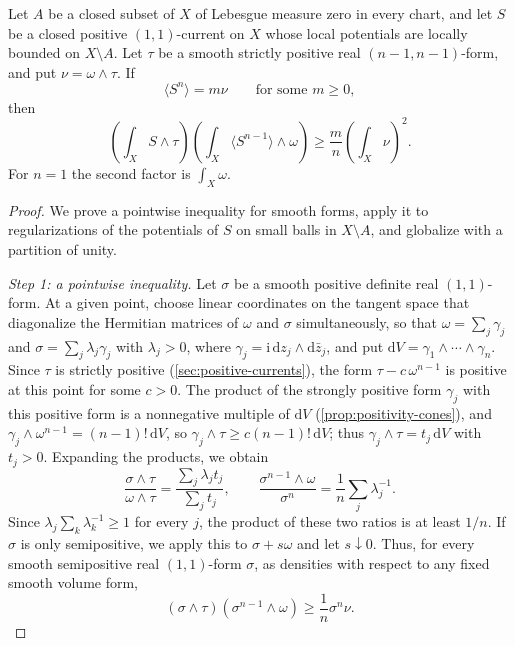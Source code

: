 \begin{lemma}\label{lem:prescribed-density-mixed-trace}
Let $A$ be a closed subset of $X$ of Lebesgue measure zero in every chart, and let $S$ be a closed positive $(1,1)$-current on $X$ whose local potentials are locally bounded on $X\setminus A$. Let $\tau$ be a smooth strictly positive real $(n-1,n-1)$-form, and put $\nu=\omega\wedge\tau$. If
\[
 \langle S^n\rangle=m\nu\qquad\text{for some }m\geq0,
\]
then
\begin{equation}\label{eq:prescribed-density-mixed-trace}
 \left(\int_X S\wedge\tau\right)
 \left(\int_X\langle S^{n-1}\rangle\wedge\omega\right)
               \geq\frac mn\left(\int_X\nu\right)^2.
\end{equation}
For $n=1$ the second factor is $\int_X\omega$.
\end{lemma}
\begin{proof}
We prove a pointwise inequality for smooth forms, apply it to regularizations of the potentials of $S$ on small balls in $X\setminus A$, and globalize with a partition of unity.

\emph{Step 1: a pointwise inequality.} Let $\sigma$ be a smooth positive definite real $(1,1)$-form. At a given point, choose linear coordinates on the tangent space that diagonalize the Hermitian matrices of $\omega$ and $\sigma$ simultaneously, so that $\omega=\sum_j\gamma_j$ and $\sigma=\sum_j\lambda_j\gamma_j$ with $\lambda_j>0$, where $\gamma_j=\mathrm i\,\mathrm dz_j\wedge\mathrm d\bar z_j$, and put $\mathrm dV=\gamma_1\wedge\cdots\wedge\gamma_n$. Since $\tau$ is strictly positive (\cref{sec:positive-currents}), the form $\tau-c\,\omega^{n-1}$ is positive at this point for some $c>0$. The product of the strongly positive form $\gamma_j$ with this positive form is a nonnegative multiple of $\mathrm dV$ (\cref{prop:positivity-cones}), and $\gamma_j\wedge\omega^{n-1}=(n-1)!\,\mathrm dV$, so $\gamma_j\wedge\tau\geq c(n-1)!\,\mathrm dV$; thus $\gamma_j\wedge\tau=t_j\,\mathrm dV$ with $t_j>0$. Expanding the products, we obtain
\[
 \frac{\sigma\wedge\tau}{\omega\wedge\tau}
       =\frac{\sum_j\lambda_jt_j}{\sum_jt_j},\qquad
 \frac{\sigma^{n-1}\wedge\omega}{\sigma^n}
       =\frac1n\sum_j\lambda_j^{-1}.
\]
Since $\lambda_j\sum_k\lambda_k^{-1}\geq1$ for every $j$, the product of these two ratios is at least $1/n$. If $\sigma$ is only semipositive, we apply this to $\sigma+s\omega$ and let $s\downarrow0$. Thus, for every smooth semipositive real $(1,1)$-form $\sigma$, as densities with respect to any fixed smooth volume form,
\begin{equation}\label{eq:pointwise-mixed-trace}
 (\sigma\wedge\tau)(\sigma^{n-1}\wedge\omega)
                     \geq\frac1n\sigma^n\nu.
\end{equation}


\end{proof}
